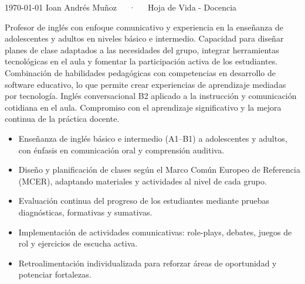 \documentclass[11pt, a4paper]{awesome-cv}
\begin{document}
\makecvheader[C]

\makecvfooter
  {\today}
  {Ioan Andrés Muñoz~~~·~~~Hoja de Vida - Docencia}
  {\thepage}


Profesor de inglés con enfoque comunicativo y experiencia en la enseñanza de adolescentes y adultos en niveles básico e intermedio. Capacidad para diseñar planes de clase adaptados a las necesidades del grupo, integrar herramientas tecnológicas en el aula y fomentar la participación activa de los estudiantes. Combinación de habilidades pedagógicas con competencias en desarrollo de software educativo, lo que permite crear experiencias de aprendizaje mediadas por tecnología. Inglés conversacional B2 aplicado a la instrucción y comunicación cotidiana en el aula. Compromiso con el aprendizaje significativo y la mejora continua de la práctica docente.


\begin{itemize}
  \item Enseñanza de inglés básico e intermedio (A1--B1) a adolescentes y adultos, con énfasis en comunicación oral y comprensión auditiva.
  \item Diseño y planificación de clases según el Marco Común Europeo de Referencia (MCER), adaptando materiales y actividades al nivel de cada grupo.
  \item Evaluación continua del progreso de los estudiantes mediante pruebas diagnósticas, formativas y sumativas.
  \item Implementación de actividades comunicativas: role-plays, debates, juegos de rol y ejercicios de escucha activa.
  \item Retroalimentación individualizada para reforzar áreas de oportunidad y potenciar fortalezas.
\end{itemize}

\end{document}
